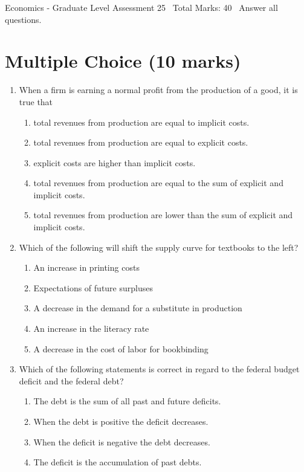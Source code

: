 \documentclass[12pt]{article}
\begin{document}
\begin{center}
Economics - Graduate Level Assessment 25 \
Total Marks: 40 \
Answer all questions.
\end{center}

\section*{Multiple Choice (10 marks)}
\begin{enumerate}[label=\arabic*.]
\item When a firm is earning a normal profit from the production of a good, it is true that
\begin{enumerate}[label=(\alph*)]
    \item total revenues from production are equal to implicit costs.
    \item total revenues from production are equal to explicit costs.
    \item explicit costs are higher than implicit costs.
    \item total revenues from production are equal to the sum of explicit and implicit costs.
    \item total revenues from production are lower than the sum of explicit and implicit costs.
\end{enumerate}
\item Which of the following will shift the supply curve for textbooks to the left?
\begin{enumerate}[label=(\alph*)]
    \item An increase in printing costs
    \item Expectations of future surpluses
    \item A decrease in the demand for a substitute in production
    \item An increase in the literacy rate
    \item A decrease in the cost of labor for bookbinding
\end{enumerate}
\item Which of the following statements is correct in regard to the federal budget deficit and the federal debt?
\begin{enumerate}[label=(\alph*)]
    \item The debt is the sum of all past and future deficits.
    \item When the debt is positive the deficit decreases.
    \item When the deficit is negative the debt decreases.
    \item The deficit is the accumulation of past debts.

\end{enumerate}
\end{enumerate}
\end{document}
